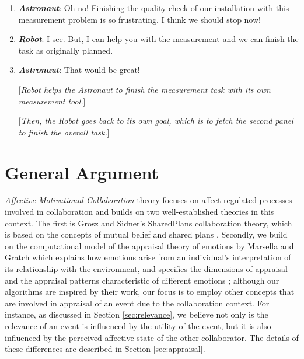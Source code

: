 \documentclass[12pt]{report}
\begin{document}
\begin{enumerate}
  \item \textit{\textbf{Astronaut}}: Oh no! Finishing the quality check of our
  installation with this measurement problem is so frustrating. I think we
  should stop now!

  \item \textit{\textbf{Robot}}: I see. But, I can help you with the measurement
  and we can finish the task as originally planned.

  \item \textit{\textbf{Astronaut}}: That would be great!

  [\textit{Robot helps the Astronaut to finish the measurement task with its
  own measurement tool.}]
  
  [\textit{Then, the Robot goes back to its own goal, which is to fetch the
  second panel to finish the overall task.}]

\end{enumerate}

\section{General Argument}

\textit{Affective Motivational Collaboration} theory focuses on
affect-regulated processes involved in collaboration and builds on two
well-established theories in this context. The first is Grosz and Sidner's
SharedPlans collaboration theory, which is based on the concepts of mutual
belief and shared plans \cite{grosz:shared-plans, grosz:plans-discourse}.
Secondly, we build on the computational model of the appraisal theory of
emotions by Marsella and Gratch \cite{gratch:domain-independent,
gratch:evaluating, marsella:ema-process-model, marsella:computational} which
explains how emotions arise from an individual's interpretation of its
relationship with the environment, and specifies the dimensions of appraisal and
the appraisal patterns characteristic of different emotions
\cite{scherer:appraisal-processes}; although our algorithms are
inspired by their work, our focus is to employ other concepts that are
involved in appraisal of an event due to the collaboration context. For
instance, as discussed in Section \ref{sec:relevance}, we believe not only is
the relevance of an event is influenced by the utility of the event, but it is also
influenced by the perceived affective state of the other collaborator. The
details of these differences are described in Section \ref{sec:appraisal}.
\end{document}
